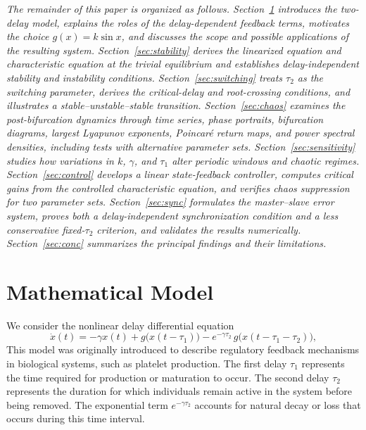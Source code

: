 \documentclass[11pt]{article}
\theoremstyle{remark}
\begin{document}
{	
\textit{The remainder of this paper is organized as follows. Section~\ref{sec:main} introduces the two-delay model, explains the roles of the delay-dependent feedback terms, motivates the choice $g(x)=k\sin x$, and discusses the scope and possible applications of the resulting system. Section~\ref{sec:stability} derives the linearized equation and characteristic equation at the trivial equilibrium and establishes delay-independent stability and instability conditions. Section~\ref{sec:switching} treats $\tau_2$ as the switching parameter, derives the critical-delay and root-crossing conditions, and illustrates a stable--unstable--stable transition. Section~\ref{sec:chaos} examines the post-bifurcation dynamics through time series, phase portraits, bifurcation diagrams, largest Lyapunov exponents, Poincar\'e return maps, and power spectral densities, including tests with alternative parameter sets. Section~\ref{sec:sensitivity} studies how variations in $k$, $\gamma$, and $\tau_1$ alter periodic windows and chaotic regimes. Section~\ref{sec:control} develops a linear state-feedback controller, computes critical gains from the controlled characteristic equation, and verifies chaos suppression for two parameter sets. Section~\ref{sec:sync} formulates the master--slave error system, proves both a delay-independent synchronization condition and a less conservative fixed-$\tau_2$ criterion, and validates the results numerically. Section~\ref{sec:conc} summarizes the principal findings and their limitations.}

}

	
\section{Mathematical Model}
\label{sec:main}
We consider the nonlinear delay differential equation
\begin{equation}
	\dot{x}(t)
	= -\gamma x(t)
	+ g\big(x(t - \tau_1)\big)
	- e^{-\gamma \tau_2}\, g\big(x(t - \tau_1 - \tau_2)\big),
	\label{eq:main}
\end{equation}
This model was originally introduced to describe regulatory feedback mechanisms in biological systems, such as platelet production.
The first delay $\tau_1$ represents the time required for production or maturation to occur.
The second delay $\tau_2$ represents the duration for which individuals remain active in the system before being removed. 
The exponential term $e^{-\gamma\tau_2}$ accounts for natural decay or loss that occurs during this time interval.
\end{document}
